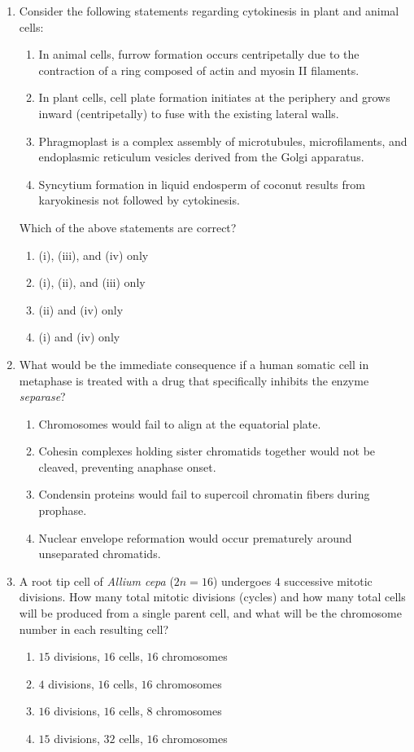 \documentclass[11pt,a4paper]{article}
\begin{document}
\begin{enumerate}[label=\textbf{\arabic*.}, leftmargin=*]
\item Consider the following statements regarding cytokinesis in plant and animal cells:
\begin{enumerate}[label=(\roman*)]
    \item In animal cells, furrow formation occurs centripetally due to the contraction of a ring composed of actin and myosin II filaments.
    \item In plant cells, cell plate formation initiates at the periphery and grows inward (centripetally) to fuse with the existing lateral walls.
    \item Phragmoplast is a complex assembly of microtubules, microfilaments, and endoplasmic reticulum vesicles derived from the Golgi apparatus.
    \item Syncytium formation in liquid endosperm of coconut results from karyokinesis not followed by cytokinesis.
\end{enumerate}
Which of the above statements are correct?
\begin{enumerate}[label=(\alph*)]
    \item (i), (iii), and (iv) only
    \item (i), (ii), and (iii) only
    \item (ii) and (iv) only
    \item (i) and (iv) only
\end{enumerate}

\item What would be the immediate consequence if a human somatic cell in metaphase is treated with a drug that specifically inhibits the enzyme \textit{separase}?
\begin{enumerate}[label=(\alph*)]
    \item Chromosomes would fail to align at the equatorial plate.
    \item Cohesin complexes holding sister chromatids together would not be cleaved, preventing anaphase onset.
    \item Condensin proteins would fail to supercoil chromatin fibers during prophase.
    \item Nuclear envelope reformation would occur prematurely around unseparated chromatids.
\end{enumerate}

\item A root tip cell of \textit{Allium cepa} ($2n = 16$) undergoes $4$ successive mitotic divisions. How many total mitotic divisions (cycles) and how many total cells will be produced from a single parent cell, and what will be the chromosome number in each resulting cell?
\begin{enumerate}[label=(\alph*)]
    \item $15$ divisions, $16$ cells, $16$ chromosomes
    \item $4$ divisions, $16$ cells, $16$ chromosomes
    \item $16$ divisions, $16$ cells, $8$ chromosomes
    \item $15$ divisions, $32$ cells, $16$ chromosomes
\end{enumerate}


\end{enumerate}
\end{document}
